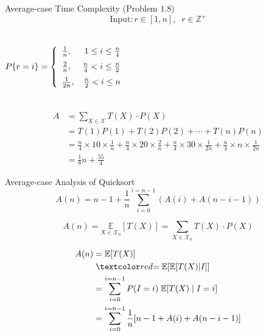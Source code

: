 \begin{frame}{}
  \begin{exampleblock}{Average-case Time Complexity (Problem $1.8$)}
    \[
      \text{Input}: r \in [1,n], \;\; r \in \mathbb{Z}^{+}
    \]

    \begin{columns}
	\[
	  P\{r = i\} = \left\{\begin{array}{lr}
	    \frac{1}{n}, & 1 \le i \le \frac{n}{4} \\[6pt]
	    \frac{2}{n}, & \frac{n}{4} < i \le \frac{n}{2} \\[6pt]
	    \frac{1}{2n}, & \frac{n}{2} < i \le n
	  \end{array}\right.
	\]
    \end{columns}
  \end{exampleblock}

  \pause
  \begin{align*}
    A &= \sum_{X \in \mathcal{X}} T(X) \cdot P(X) \\
      &= T(1) P(1) + T(2) P(2) + \cdots + T(n) P(n) \\
      &= \frac{n}{4} \times 10 \times \frac{1}{n} + \frac{n}{4} \times 20 \times \frac{2}{n} + 
         \frac{n}{4} \times 30 \times \frac{1}{2n} + \frac{n}{4} \times n \times \frac{1}{2n} \\
      &= \frac{1}{8} n + \frac{55}{4}
  \end{align*}
\end{frame}
\begin{frame}{Average-case Analysis of Quicksort}
  \[
    A(n) = n-1 + \frac{1}{n} \sum_{i=0}^{i=n-1} (A(i) + A(n-i-1))
  \]

  \[
    A(n) = \underset{X \in \mathcal{X}_{n}}{\mathbb{E}} [T(X)] = \sum_{X \in \mathcal{X}_{n}} T(X) \cdot P(X)
  \]

  \pause
  \begin{align*}
    A(n) &= \mathbb{E}[T(X)] \\
	 &\;\red{= \mathbb{E}[\mathbb{E}[T(X)|I]]} \\
	 &= \sum_{i=0}^{i=n-1} P(I = i)\; \mathbb{E}[T(X) \mid I = i] \\
	 &= \sum_{i=0}^{i=n-1} \frac{1}{n} [n-1 + A(i) + A(n-i-1)]
  \end{align*}
\end{frame}
